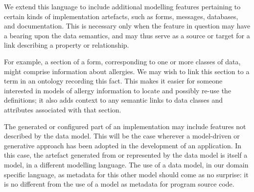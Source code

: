 We extend this language to include additional modelling features
pertaining to certain kinds of implementation artefacts, such as
forms, messages, databases, and documentation.  This is necessary only
when the feature in question may have a bearing upon the data
semantics, and may thus serve as a source or target for a link
describing a property or relationship.  

For example, a section of a form, corresponding to one or more classes
of data, might comprise information about allergies.  We may wish to
link this section to a term in an ontology recording this fact.  This
makes it easier for someone interested in models of allergy
information to locate and possibly re-use the definitions; it also
adds context to any semantic links to data classes and attributes
associated with that section.

The generated or configured part of an implementation may include
features not described by the data model.  This will be the case
wherever a model-driven or generative approach has been adopted in the
development of an application.  In this case, the artefact generated
from or represented by the data model is itself a model, in a
different modelling language.  The use of a data model, in our domain
specific language, as metadata for this other model should come as no
surprise: it is no different from the use of a model as metadata for
program source code. 


